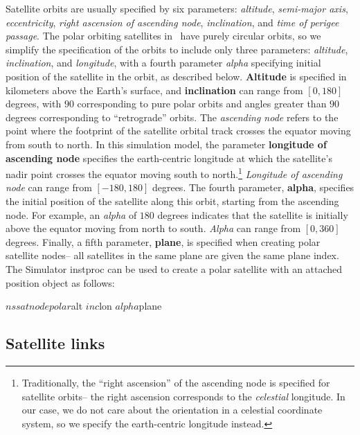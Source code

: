 \begin{itemize}
Satellite orbits are usually specified by six parameters:  {\em altitude},
{\em semi-major axis}, {\em eccentricity}, 
{\em right ascension of ascending node}, {\em inclination}, and
{\em time of perigee passage}.  The polar orbiting satellites in \ns~have
purely circular orbits, so we simplify the specification of the orbits to
include only three parameters: {\em altitude}, {\em inclination}, and
{\em longitude}, with a fourth parameter {\em alpha} specifying initial 
position of the satellite in the orbit, as described below.
{\bf Altitude} is specified in kilometers above the Earth's surface, and 
{\bf inclination} can range from $[0,180]$ degrees, with $90$ corresponding
to pure polar orbits and angles greater than $90$ degrees corresponding
to ``retrograde'' orbits.  The {\em ascending node} refers to the point
where the footprint of the satellite orbital track crosses the equator 
moving from south to north.  In this simulation model, the parameter 
{\bf longitude of ascending node} specifies the earth-centric longitude at 
which the satellite's nadir point crosses the equator moving south
to north.\footnote{Traditionally, the ``right ascension'' of the ascending
node is specified for satellite orbits-- the right ascension corresponds to the 
{\em celestial} longitude.  In our case, we do not care about the
orientation in a celestial coordinate system, so we specify the earth-centric
longitude instead.} {\em Longitude of ascending node} can range from 
$[-180,180]$ degrees.  The fourth parameter,
{\bf alpha}, specifies the initial position of the satellite along this
orbit, starting from the ascending node.  
For example, an {\em alpha} of $180$ degrees indicates that the
satellite is initially above the equator moving from north to south.
{\em Alpha} can range from $[0,360]$ degrees.
Finally, a fifth parameter, {\bf plane}, is specified when creating
polar satellite nodes-- all satellites in the same plane are given the
same plane index.
The Simulator instproc  can be 
used to create a polar satellite with an attached position object as 
follows:
\begin{program}
$ns satnode polar $alt $inc $lon $alpha $plane
\end{program}

\end{itemize}


\subsection{Satellite links}
\label{sec:satellite/usage/links}

